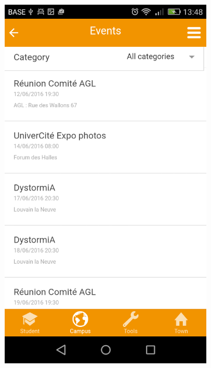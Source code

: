 \documentclass{eplmastersthesis}
\begin{document}
\begin{figure}
    \centering
\begin{subfigure}[b]{0.3\textwidth}
        \includegraphics[width=\textwidth]{Images/Application_screens/Screenshot_2016-06-06-13-48-01.png}
    \end{subfigure}
    ~ %
    \begin{subfigure}[b]{0.3\textwidth}

\end{subfigure}
\end{figure}
\end{document}
